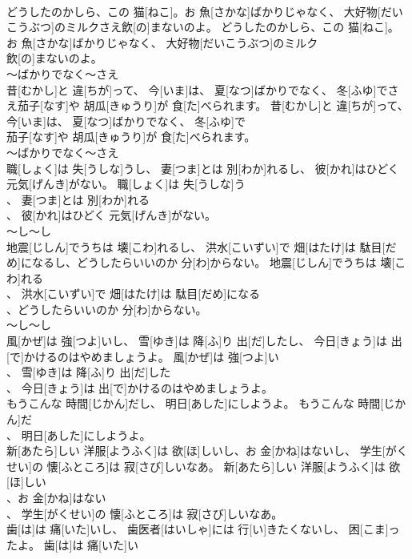 \documentclass[8pt]{extreport}
\begin{document}
\begin{CJK}{UTF8}{min}
\\	どうしたのかしら、この 猫[ねこ]。お 魚[さかな]ばかりじゃなく、 大好物[だいこうぶつ]のミルクさえ飲[の]まないのよ。	どうしたのかしら、この 猫[ねこ]。お 魚[さかな]ばかりじゃなく、 大好物[だいこうぶつ]のミルク
\\	飲[の]まないのよ。	
\\	～ばかりでなく～さえ
\\	昔[むかし]と 違[ちが]って、 今[いま]は、 夏[なつ]ばかりでなく、 冬[ふゆ]でさえ茄子[なす]や 胡瓜[きゅうり]が 食[た]べられます。	昔[むかし]と 違[ちが]って、 今[いま]は、 夏[なつ]ばかりでなく、 冬[ふゆ]で
\\	茄子[なす]や 胡瓜[きゅうり]が 食[た]べられます。	
\\	～ばかりでなく～さえ
\\	職[しょく]は 失[うしな]うし、 妻[つま]とは 別[わか]れるし、 彼[かれ]はひどく 元気[げんき]がない。	職[しょく]は 失[うしな]う
\\	、 妻[つま]とは 別[わか]れる
\\	、 彼[かれ]はひどく 元気[げんき]がない。	
\\	～し～し 
\\	地震[じしん]でうちは 壊[こわ]れるし、 洪水[こいずい]で 畑[はたけ]は 駄目[だめ]になるし、どうしたらいいのか 分[わ]からない。	地震[じしん]でうちは 壊[こわ]れる
\\	、 洪水[こいずい]で 畑[はたけ]は 駄目[だめ]になる
\\	、どうしたらいいのか 分[わ]からない。	
\\	～し～し 
\\	風[かぜ]は 強[つよ]いし、 雪[ゆき]は 降[ふ]り 出[だ]したし、 今日[きょう]は 出[で]かけるのはやめましょうよ。	風[かぜ]は 強[つよ]い
\\	、 雪[ゆき]は 降[ふ]り 出[だ]した
\\	、 今日[きょう]は 出[で]かけるのはやめましょうよ。	
\\	もうこんな 時間[じかん]だし、 明日[あした]にしようよ。	もうこんな 時間[じかん]だ
\\	、 明日[あした]にしようよ。	
\\	新[あたら]しい 洋服[ようふく]は 欲[ほ]しいし、お 金[かね]はないし、 学生[がくせい]の 懐[ふところ]は 寂[さび]しいなあ。	新[あたら]しい 洋服[ようふく]は 欲[ほ]しい
\\	、お 金[かね]はない
\\	、 学生[がくせい]の 懐[ふところ]は 寂[さび]しいなあ。	
\\	歯[は]は 痛[いた]いし、 歯医者[はいしゃ]には 行[い]きたくないし、 困[こま]ったよ。	歯[は]は 痛[いた]い

\end{CJK}
\end{document}
